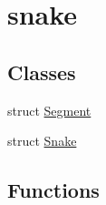 \hypertarget{group__snake}{}\section{snake}
\label{group__snake}
\subsection*{Classes}
\begin{DoxyCompactItemize}
\item 
struct \hyperlink{structSegment}{Segment}
\item 
struct \hyperlink{structSnake}{Snake}
\end{DoxyCompactItemize}
\subsection*{Functions}
